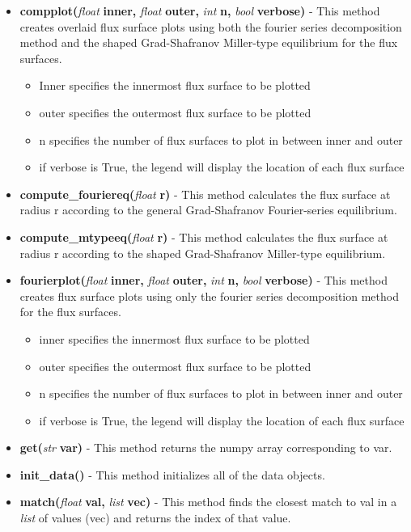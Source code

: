 \documentclass{article}
\begin{document}
\begin{itemize}
\begin{itemize}
\item \textbf{compplot(}\emph{float}\textbf{ inner, }\emph{float}\textbf{ outer, }\emph{int}\textbf{ n, }\emph{bool}\textbf{ verbose)} - This method creates overlaid flux surface plots using both the fourier series decomposition method and the shaped Grad-Shafranov Miller-type equilibrium for the flux surfaces.
\begin{itemize}
\item Inner specifies the innermost flux surface to be plotted
\item outer specifies the outermost flux surface to be plotted
\item n specifies the number of flux surfaces to plot in between inner and outer
\item if verbose is True, the legend will display the location of each flux surface
\end{itemize}
\item \textbf{compute\_fouriereq(}\emph{float}\textbf{ r)} - This method calculates the flux surface at radius r according to the general Grad-Shafranov Fourier-series equilibrium.
\item \textbf{compute\_mtypeeq(}\emph{float}\textbf{ r)} - This method calculates the flux surface at radius r according to the shaped Grad-Shafranov Miller-type equilibrium.
\item \textbf{fourierplot(}\emph{float}\textbf{ inner, }\emph{float}\textbf{ outer, }\emph{int}\textbf{ n, }\emph{bool}\textbf{ verbose)} - This method creates flux surface plots using only the fourier series decomposition method for the flux surfaces.
\begin{itemize}
\item inner specifies the innermost flux surface to be plotted
\item outer specifies the outermost flux surface to be plotted
\item n specifies the number of flux surfaces to plot in between inner and outer
\item if verbose is True, the legend will display the location of each flux surface
\end{itemize}
\item \textbf{get(}\emph{str}\textbf{ var)} - This method returns the numpy array corresponding to var.
\item \textbf{init\_data()} - This method initializes all of the data objects.
\item \textbf{match(}\emph{float}\textbf{ val, }\emph{list}\textbf{ vec)} - This method finds the closest match to val in a \emph{list} of values (vec) and returns the index of that value.

\end{itemize}
\end{itemize}
\end{document}
